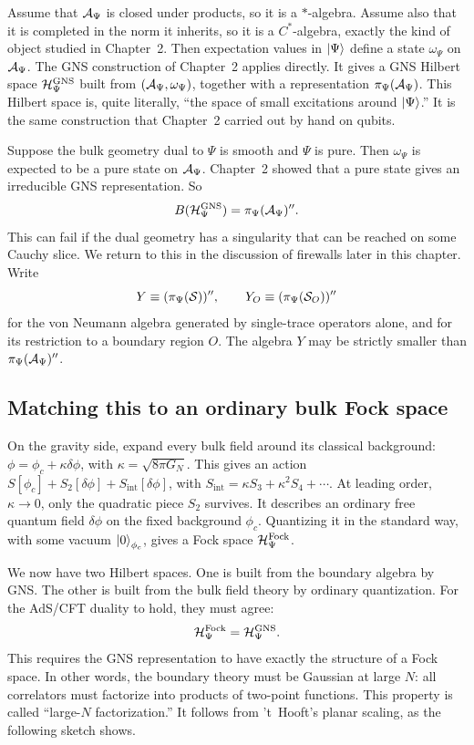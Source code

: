 Assume that $\mathcal{A}_\Psi$ is closed under products, so it is a $*$-algebra. Assume also that it is completed in
the norm it inherits, so it is a $C^*$-algebra, exactly the kind of object studied in Chapter~2. Then
expectation values in $\ket\Psi$ define a state $\omega_\Psi$ on $\mathcal{A}_\Psi$. The GNS construction of Chapter~2
applies directly. It gives a GNS Hilbert space $\mathcal{H}_\Psi^{\text{GNS}}$ built from $(\mathcal{A}_\Psi,\omega_\Psi)$,
together with a representation $\pi_\Psi(\mathcal{A}_\Psi)$. This Hilbert space is, quite literally, ``the space of
small excitations around $\ket\Psi$.'' It is the same construction that Chapter~2 carried out by hand on qubits.

Suppose the bulk geometry dual to $\Psi$ is smooth and $\Psi$ is pure. Then $\omega_\Psi$ is expected to be a
pure state on $\mathcal{A}_\Psi$. Chapter~2 showed that a pure state gives an irreducible GNS representation. So
\begin{equation}
B(\mathcal{H}_\Psi^{\text{GNS}})=\pi_\Psi(\mathcal{A}_\Psi)'' .
\label{eq:ads-irreducible}
\end{equation}
This can fail if the dual geometry has a singularity that can be reached on some Cauchy slice. We return to
this in the discussion of firewalls later in this chapter. Write
\[
Y\equiv(\pi_\Psi(\mathcal{S}))'', \qquad Y_O\equiv(\pi_\Psi(\mathcal{S}_O))''
\]
for the von Neumann algebra generated by single-trace operators alone, and for its restriction to a boundary
region $O$. The algebra $Y$ may be strictly smaller than $\pi_\Psi(\mathcal{A}_\Psi)''$.

\subsection*{Matching this to an ordinary bulk Fock space}

On the gravity side, expand every bulk field around its classical background:
$\phi=\phi_c+\kappa\delta\phi$, with $\kappa=\sqrt{8\pi G_N}$. This gives an action
$S[\phi_c]+S_2[\delta\phi]+S_{\text{int}}[\delta\phi]$, with $S_{\text{int}}=\kappa S_3+\kappa^2S_4+\cdots$. At
leading order, $\kappa\to0$, only the quadratic piece $S_2$ survives. It describes an ordinary free quantum field
$\delta\phi$ on the fixed background $\phi_c$. Quantizing it in the standard way, with some vacuum
$\ket0_{\phi_c}$, gives a Fock space $\mathcal{H}_\Psi^{\text{Fock}}$.

We now have two Hilbert spaces. One is built from the boundary algebra by GNS. The other is built from the bulk
field theory by ordinary quantization. For the AdS/CFT duality to hold, they must agree:
\begin{equation}
\mathcal{H}_\Psi^{\text{Fock}} = \mathcal{H}_\Psi^{\text{GNS}} .
\label{eq:ads-fock-gns}
\end{equation}
This requires the GNS representation to have exactly the structure of a Fock space. In other words, the
boundary theory must be Gaussian at large $N$: all correlators must factorize into products of two-point
functions. This property is called ``large-$N$ factorization.'' It follows from 't~Hooft's planar scaling, as
the following sketch shows.


